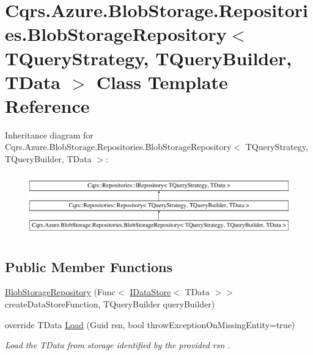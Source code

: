\hypertarget{classCqrs_1_1Azure_1_1BlobStorage_1_1Repositories_1_1BlobStorageRepository}{}\section{Cqrs.\+Azure.\+Blob\+Storage.\+Repositories.\+Blob\+Storage\+Repository$<$ T\+Query\+Strategy, T\+Query\+Builder, T\+Data $>$ Class Template Reference}
\label{classCqrs_1_1Azure_1_1BlobStorage_1_1Repositories_1_1BlobStorageRepository}
Inheritance diagram for Cqrs.\+Azure.\+Blob\+Storage.\+Repositories.\+Blob\+Storage\+Repository$<$ T\+Query\+Strategy, T\+Query\+Builder, T\+Data $>$\+:\begin{figure}[H]
\begin{center}
\leavevmode
\includegraphics[height=2.749591cm]{classCqrs_1_1Azure_1_1BlobStorage_1_1Repositories_1_1BlobStorageRepository}
\end{center}
\end{figure}
\subsection*{Public Member Functions}
\begin{DoxyCompactItemize}
\item 
\hyperlink{classCqrs_1_1Azure_1_1BlobStorage_1_1Repositories_1_1BlobStorageRepository_a11ec03d2f22e21b2a84556fd26077909_a11ec03d2f22e21b2a84556fd26077909}{Blob\+Storage\+Repository} (Func$<$ \hyperlink{interfaceCqrs_1_1DataStores_1_1IDataStore}{I\+Data\+Store}$<$ T\+Data $>$$>$ create\+Data\+Store\+Function, T\+Query\+Builder query\+Builder)
\item 
override T\+Data \hyperlink{classCqrs_1_1Azure_1_1BlobStorage_1_1Repositories_1_1BlobStorageRepository_a7c5a3ca4d92cf4954508fb3e583eb49e_a7c5a3ca4d92cf4954508fb3e583eb49e}{Load} (Guid rsn, bool throw\+Exception\+On\+Missing\+Entity=true)
\begin{DoxyCompactList}\small\item\em Load the {\itshape T\+Data}  from storage identified by the provided {\itshape rsn} . \end{DoxyCompactList}\end{DoxyCompactItemize}
